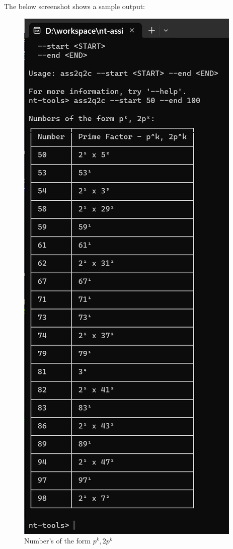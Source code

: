 \documentclass{article}
\begin{document}
\begin{enumerate}
        The below screenshot shows a sample output:
        \begin{figure}[H]
            \centering
            \includegraphics[scale=0.5]{p_k_2p_k.png}
            \caption{Number's of the form $p^k, 2p^k$}
        \end{figure}


\end{enumerate}
\end{document}
